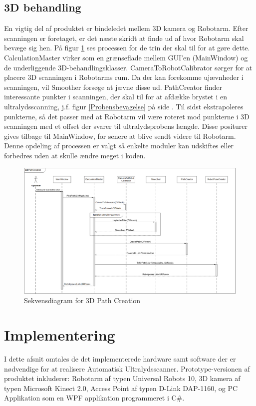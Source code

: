 \subsection{3D behandling}
En vigtig del af produktet er bindeledet mellem 3D kamera og Robotarm. Efter scanningen er foretaget, er det næste skridt at finde ud af hvor Robotarm skal bevæge sig hen. På figur \ref{seq_pathcreation} ses processen for de trin der skal til for at gøre dette. CalculationMaster virker som en grænseflade mellem GUI'en (MainWindow) og de underliggende 3D-behandlingsklasser. CameraToRobotCalibrator sørger for at placere 3D scanningen i Robotarms rum. Da der kan forekomme ujævnheder i scanningen, vil Smoother forsøge at jævne disse ud. PathCreator finder interessante punkter i scanningen, der skal til for at afdække brystet i en ultralydsscanning, j.f. figur \ref{Probensbevagelse} på side \pageref{Probensbevagelse}. Til sidst ekstrapoleres punkterne, så det passer med at Robotarm vil være roteret mod punkterne i 3D scanningen med et offset der svarer til ultralydsprobens længde.
Disse positurer gives tilbage til MainWindow, for senere at blive sendt videre til Robotarm. 
Denne opdeling af processen er valgt så enkelte moduler kan udskiftes eller forbedres uden at skulle ændre meget i koden.
\begin{figure}[H]
    \centering
    \includegraphics[width=1\textwidth]{figurer/d/Design/Sequence/sd_pathcreation}
    \caption{Sekvensdiagram for 3D Path Creation}
    \label{seq_pathcreation}
\end{figure}
\newpage
\section{Implementering}
I dette afsnit omtales de det implementerede hardware samt software der er nødvendige for at realisere Automatisk Ultralydsscanner.
Prototype-versionen af produktet inkluderer: Robotarm af typen Universal Robots 10, 3D kamera af typen Microsoft Kinect 2.0, Access Point af typen D-Link DAP-1160, og PC Applikation som en WPF applikation programmeret i C\#.

